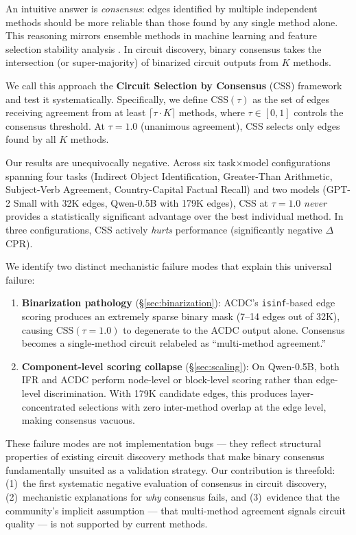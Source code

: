 \documentclass[11pt,a4paper]{article}
\begin{document}
An intuitive answer is \emph{consensus}: edges identified by multiple independent methods should be more reliable than those found by any single method alone. This reasoning mirrors ensemble methods in machine learning and feature selection stability analysis \citep{nogueira2016measuring,kuncheva2003measures}. In circuit discovery, binary consensus takes the intersection (or super-majority) of binarized circuit outputs from $K$ methods.

We call this approach the \textbf{Circuit Selection by Consensus} (CSS) framework and test it systematically. Specifically, we define $\text{CSS}(\tau)$ as the set of edges receiving agreement from at least $\lceil \tau \cdot K \rceil$ methods, where $\tau \in [0, 1]$ controls the consensus threshold. At $\tau{=}1.0$ (unanimous agreement), CSS selects only edges found by all $K$ methods.

Our results are unequivocally negative. Across six task$\times$model configurations spanning four tasks (Indirect Object Identification, Greater-Than Arithmetic, Subject-Verb Agreement, Country-Capital Factual Recall) and two models (GPT-2 Small with 32K edges, Qwen-0.5B with 179K edges), CSS at $\tau{=}1.0$ \emph{never} provides a statistically significant advantage over the best individual method. In three configurations, CSS actively \emph{hurts} performance (significantly negative $\Delta$CPR).

We identify two distinct mechanistic failure modes that explain this universal failure:

\begin{enumerate}
    \item \textbf{Binarization pathology} (\S\ref{sec:binarization}): ACDC's \texttt{isinf}-based edge scoring produces an extremely sparse binary mask (7--14 edges out of 32K), causing $\text{CSS}(\tau{=}1.0)$ to degenerate to the ACDC output alone. Consensus becomes a single-method circuit relabeled as ``multi-method agreement.''

    \item \textbf{Component-level scoring collapse} (\S\ref{sec:scaling}): On Qwen-0.5B, both IFR and ACDC perform node-level or block-level scoring rather than edge-level discrimination. With 179K candidate edges, this produces layer-concentrated selections with zero inter-method overlap at the edge level, making consensus vacuous.
\end{enumerate}

These failure modes are not implementation bugs --- they reflect structural properties of existing circuit discovery methods that make binary consensus fundamentally unsuited as a validation strategy. Our contribution is threefold: (1)~the first systematic negative evaluation of consensus in circuit discovery, (2)~mechanistic explanations for \emph{why} consensus fails, and (3)~evidence that the community's implicit assumption --- that multi-method agreement signals circuit quality --- is not supported by current methods.
\end{document}
